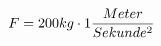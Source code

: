 \documentclass[preview]{standalone}
\begin{document}
\begin{align*}
\special{dvisvgm:raw <g id='unique000'>}F = 200kg \cdot 1 \frac{Meter}{Sekunde^{2}}\special{dvisvgm:raw </g>}
\end{align*}
\end{document}
